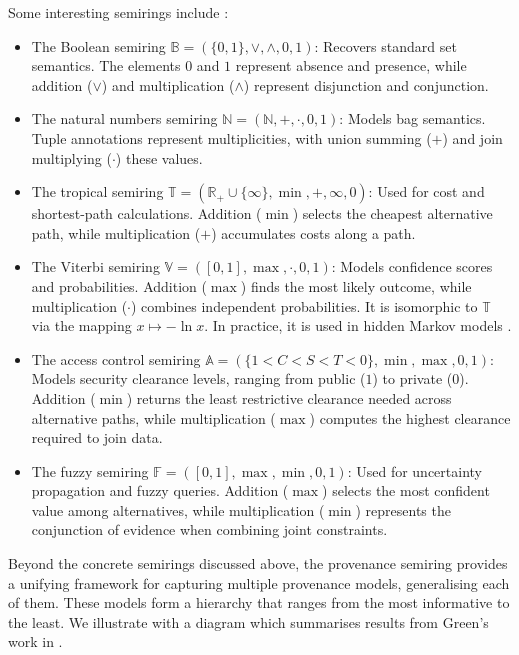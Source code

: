 \documentclass[oneside, 11pt]{amsbook}
\theoremstyle{plain}
\theoremstyle{definition}
\theoremstyle{remark}
\begin{document}
\begin{exmpl}
    Some interesting semirings include \cite{Green2017}:
    \begin{itemize}
        \item The Boolean semiring $\mathbb{B} = (\{0,1\}, \lor, \land, 0, 1)$: Recovers standard set semantics. The elements $0$ and $1$ represent absence and presence, while addition ($\lor$) and multiplication ($\land$) represent disjunction and conjunction.
        \item The natural numbers semiring $\mathbb{N} = (\mathbb{N}, +, \cdot, 0, 1)$: Models bag semantics. Tuple annotations represent multiplicities, with union summing ($+$) and join multiplying ($\cdot$) these values.
        \item The tropical semiring $\mathbb{T} = (\mathbb{R}_+ \cup \{\infty\}, \min, +, \infty, 0)$: Used for cost and shortest-path calculations. Addition ($\min$) selects the cheapest alternative path, while multiplication ($+$) accumulates costs along a path.
        \item The Viterbi semiring $\mathbb{V} = ([0,1], \max, \cdot, 0, 1)$: Models confidence scores and probabilities. Addition ($\max$) finds the most likely outcome, while multiplication ($\cdot$) combines independent probabilities. It is isomorphic to $\mathbb{T}$ via the mapping $x \mapsto -\ln x$. In practice, it is used in hidden Markov models \cite{Rabiner1989}.
        \item The access control semiring $\mathbb{A} = (\{1 < C < S < T < 0\}, \min, \max, 0, 1)$: Models security clearance levels, ranging from public ($1$) to private ($0$). Addition ($\min$) returns the least restrictive clearance needed across alternative paths, while multiplication ($\max$) computes the highest clearance required to join data.
        \item The fuzzy semiring $\mathbb{F} = ([0,1], \max, \min, 0, 1)$: Used for uncertainty propagation and fuzzy queries. Addition ($\max$) selects the most confident value among alternatives, while multiplication ($\min$) represents the conjunction of evidence when combining joint constraints.
    \end{itemize}
\end{exmpl}

Beyond the concrete semirings discussed above, the provenance semiring provides a unifying framework for capturing multiple provenance models, generalising each of them. These models form a hierarchy that ranges from the most informative to the least. We illustrate with a diagram which summarises results from Green's work in \cite{Green2011a}.
\end{document}
